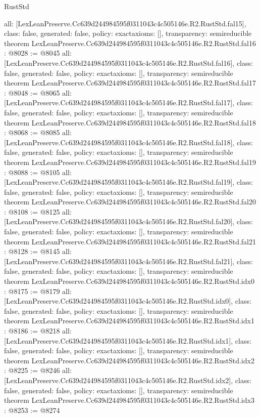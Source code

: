 \begin{lexlean}{RustStd}
\begin{coremodule}
{  all: [LexLeanPreserve.Cc639d244984595f0311043c4c505146e.R2.RustStd.fal15],
  class: false,
  generated: false,
  policy: exact{axioms: []},
  transparency: semireducible
}
theorem LexLeanPreserve.Cc639d244984595f0311043c4c505146e.R2.RustStd.fal16 : @8028 := @8045 {
  all: [LexLeanPreserve.Cc639d244984595f0311043c4c505146e.R2.RustStd.fal16],
  class: false,
  generated: false,
  policy: exact{axioms: []},
  transparency: semireducible
}
theorem LexLeanPreserve.Cc639d244984595f0311043c4c505146e.R2.RustStd.fal17 : @8048 := @8065 {
  all: [LexLeanPreserve.Cc639d244984595f0311043c4c505146e.R2.RustStd.fal17],
  class: false,
  generated: false,
  policy: exact{axioms: []},
  transparency: semireducible
}
theorem LexLeanPreserve.Cc639d244984595f0311043c4c505146e.R2.RustStd.fal18 : @8068 := @8085 {
  all: [LexLeanPreserve.Cc639d244984595f0311043c4c505146e.R2.RustStd.fal18],
  class: false,
  generated: false,
  policy: exact{axioms: []},
  transparency: semireducible
}
theorem LexLeanPreserve.Cc639d244984595f0311043c4c505146e.R2.RustStd.fal19 : @8088 := @8105 {
  all: [LexLeanPreserve.Cc639d244984595f0311043c4c505146e.R2.RustStd.fal19],
  class: false,
  generated: false,
  policy: exact{axioms: []},
  transparency: semireducible
}
theorem LexLeanPreserve.Cc639d244984595f0311043c4c505146e.R2.RustStd.fal20 : @8108 := @8125 {
  all: [LexLeanPreserve.Cc639d244984595f0311043c4c505146e.R2.RustStd.fal20],
  class: false,
  generated: false,
  policy: exact{axioms: []},
  transparency: semireducible
}
theorem LexLeanPreserve.Cc639d244984595f0311043c4c505146e.R2.RustStd.fal21 : @8128 := @8145 {
  all: [LexLeanPreserve.Cc639d244984595f0311043c4c505146e.R2.RustStd.fal21],
  class: false,
  generated: false,
  policy: exact{axioms: []},
  transparency: semireducible
}
theorem LexLeanPreserve.Cc639d244984595f0311043c4c505146e.R2.RustStd.idx0 : @8175 := @8179 {
  all: [LexLeanPreserve.Cc639d244984595f0311043c4c505146e.R2.RustStd.idx0],
  class: false,
  generated: false,
  policy: exact{axioms: []},
  transparency: semireducible
}
theorem LexLeanPreserve.Cc639d244984595f0311043c4c505146e.R2.RustStd.idx1 : @8186 := @8218 {
  all: [LexLeanPreserve.Cc639d244984595f0311043c4c505146e.R2.RustStd.idx1],
  class: false,
  generated: false,
  policy: exact{axioms: []},
  transparency: semireducible
}
theorem LexLeanPreserve.Cc639d244984595f0311043c4c505146e.R2.RustStd.idx2 : @8225 := @8246 {
  all: [LexLeanPreserve.Cc639d244984595f0311043c4c505146e.R2.RustStd.idx2],
  class: false,
  generated: false,
  policy: exact{axioms: []},
  transparency: semireducible
}
theorem LexLeanPreserve.Cc639d244984595f0311043c4c505146e.R2.RustStd.idx3 : @8253 := @8274 {
}
\end{coremodule}
\end{lexlean}
